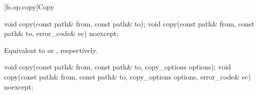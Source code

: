 [fs.op.copy]{Copy}

%
\begin{itemdecl}
void copy(const path& from, const path& to);
void copy(const path& from, const path& to, error_code& ec) noexcept;
\end{itemdecl}

\begin{itemdescr}
\pnum
\effects Equivalent to
 or
, respectively.
\end{itemdescr}

%
\begin{itemdecl}
void copy(const path& from, const path& to, copy_options options);
void copy(const path& from, const path& to, copy_options options,
          error_code& ec) noexcept;
\end{itemdecl}

